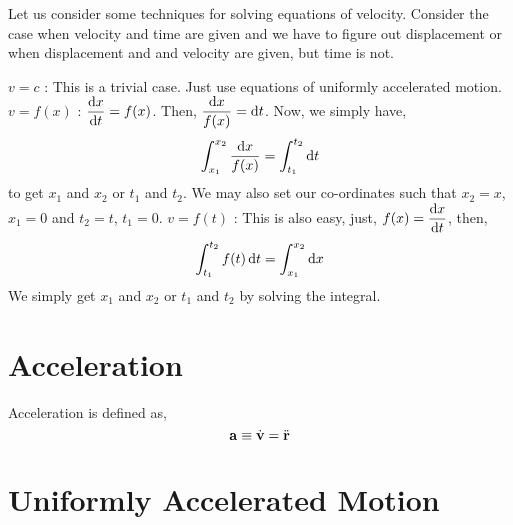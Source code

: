 \begin{algorithm}
    Let us consider some techniques for solving equations of velocity. Consider the case when velocity and time are given
    and we have to figure out displacement or when displacement and and velocity are given, but time is not. 
    \begin{enumerate}
        \ii \(v = c\) : This is a trivial case. Just use equations of uniformly accelerated motion.
        \ii \(v = f(x)\) : \(\displaystyle \derivative{x}{t} = f(x)\). Then, \(\dfrac{\differential{x}}{f(x)} = \differential{t}\).
        Now, we simply have, \[
            \int^{x_2}_{x_1} \frac{\differential{x}}{f(x)} = \int^{t_2}_{t_1} \differential{t}
        \] to get \(x_1\) and \(x_2\) or \(t_1\) and \(t_2\). We may also set our co-ordinates such that \(x_2 = x\), \(x_1 = 0\) and \(t_2 = t\), \(t_1 = 0\).
        \ii \(v = f(t)\) : This is also easy, just, \(\displaystyle f(x) = \derivative{x}{t}\), then,
        \[
            \int^{t_2}_{t_1} f(t) \differential{t} = \int^{x_2}_{x_1} \differential{x}
        \] We simply get \(x_1\) and \(x_2\) or \(t_1\) and \(t_2\) by solving the integral.
    \end{enumerate}
\end{algorithm}

\section{Acceleration}



\begin{definition}
    [Acceleration]
    \label{def: acceleration}
    Acceleration is defined as,
    \begin{equation}
        \mathbf{a} \equiv \dot{\mathbf{v}} = \ddot{\mathbf{r}}    
    \end{equation}
\end{definition}


\section{Uniformly Accelerated Motion}

